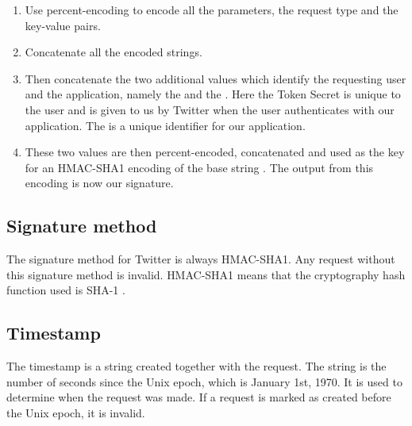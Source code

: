 \begin{enumerate}
  \item  Use percent-encoding to encode all the parameters, the
  request type and the key-value pairs.
  \item Concatenate all the encoded strings.
  \item Then concatenate the two additional values which identify the
  requesting user and the application, namely the 
  and the . Here the Token Secret is unique to the user
  and is given to us by Twitter when the user authenticates with our
  application. The  is a unique identifier for our
  application.
  \item These two values are then percent-encoded, concatenated and used as the
  key for an HMAC-SHA1 encoding of the base string \citep{TwitterHMACSHA}. The
  output from this encoding is now our signature.
\end{enumerate}

 
\subsection*{Signature method}
The signature method for Twitter is always \ac{HMAC-SHA1}. Any request without
this signature method is invalid. \ac{HMAC-SHA1} means that the cryptography
hash function used is \acs{SHA-1} \citep{TwitterHMACSHA}.

\subsection*{Timestamp}
The timestamp is a string created together with the request. The string is the
number of seconds since the Unix epoch, which is January 1st, 1970. It is used
to determine when the request was made. If a request is marked as created before
the Unix epoch, it is invalid.

